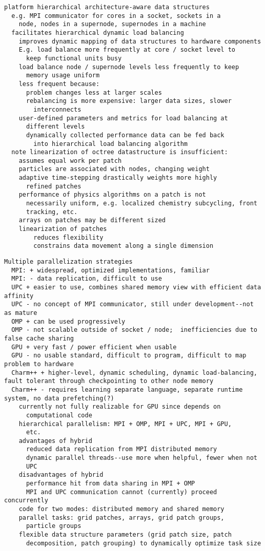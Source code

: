 \documentclass{article}
\begin{document}
\begin{verbatim}
platform hierarchical architecture-aware data structures
  e.g. MPI communicator for cores in a socket, sockets in a
    node, nodes in a supernode, supernodes in a machine
  facilitates hierarchical dynamic load balancing
    improves dynamic mapping of data structures to hardware components
    E.g. load balance more frequently at core / socket level to
      keep functional units busy
    load balance node / supernode levels less frequently to keep
      memory usage uniform
    less frequent because:
      problem changes less at larger scales
      rebalancing is more expensive: larger data sizes, slower
        interconnects
    user-defined parameters and metrics for load balancing at
      different levels
      dynamically collected performance data can be fed back
        into hierarchical load balancing algorithm
  note linearization of octree datastructure is insufficient:
    assumes equal work per patch
    particles are associated with nodes, changing weight
    adaptive time-stepping drastically weights more highly
      refined patches
    performance of physics algorithms on a patch is not
      necessarily uniform, e.g. localized chemistry subcycling, front
      tracking, etc.
    arrays on patches may be different sized
    linearization of patches 
        reduces flexibility
        constrains data movement along a single dimension
\end{verbatim}

\begin{verbatim}
Multiple parallelization strategies
  MPI: + widespread, optimized implementations, familiar
  MPI: - data replication, difficult to use
  UPC + easier to use, combines shared memory view with efficient data affinity
  UPC - no concept of MPI communicator, still under development--not as mature
  OMP + can be used progressively
  OMP - not scalable outside of socket / node;  inefficiencies due to false cache sharing
  GPU + very fast / power efficient when usable
  GPU - no usable standard, difficult to program, difficult to map problem to hardware
  Charm++ + higher-level, dynamic scheduling, dynamic load-balancing, fault tolerant through checkpointing to other node memory
  Charm++ - requires learning separate language, separate runtime system, no data prefetching(?)
    currently not fully realizable for GPU since depends on
      computational code
    hierarchical parallelism: MPI + OMP, MPI + UPC, MPI + GPU,
      etc.
    advantages of hybrid
      reduced data replication from MPI distributed memory
      dynamic parallel threads--use more when helpful, fewer when not
      UPC
    disadvantages of hybrid
      performance hit from data sharing in MPI + OMP
      MPI and UPC communication cannot (currently) proceed concurrently
    code for two modes: distributed memory and shared memory
    parallel tasks: grid patches, arrays, grid patch groups,
      particle groups
    flexible data structure parameters (grid patch size, patch
      decomposition, patch grouping) to dynamically optimize task size
\end{verbatim}
\end{document}

